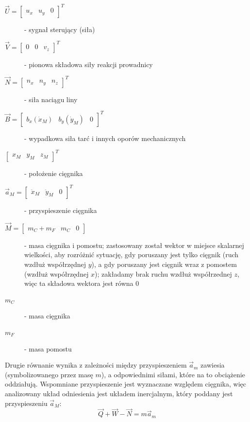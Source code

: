 \documentclass[10pt]{article}
\begin{document}
\begin{description}
\item[$\vec{U} = \begin{bmatrix} u_x & u_y & 0 \end{bmatrix}^T$] - sygnał sterujący (siła)
\item[$\vec{V} = \begin{bmatrix} 0 & 0 & v_z \end{bmatrix}^T$] - pionowa składowa siły reakcji prowadnicy
\item[$\vec{N} = \begin{bmatrix} n_x & n_y & n_z \end{bmatrix}^T$] - siła naciągu liny
\item[$\vec{B} = \begin{bmatrix} b_x (\dot{x}_M) & b_y (\dot{y}_M) & 0 \end{bmatrix}^T$] - wypadkowa siła tarć i innych oporów mechanicznych
\item[$\begin{bmatrix} x_M & y_M & z_M \end{bmatrix}^T$] - położenie cięgnika
\item[$\vec{a}_M = \begin{bmatrix} \ddot{x}_M & \ddot{y}_M & 0 \end{bmatrix}^T$] - przyspieszenie cięgnika
\item[$\vec{M} = \begin{bmatrix} m_C + m_F & m_C & 0 \end{bmatrix}$] - masa cięgnika i pomostu; zastosowany został wektor w miejsce skalarnej wielkości, aby rozróżnić sytuację, gdy poruszany jest tylko cięgnik (ruch wzdłuż współrzędnej $y$), a gdy poruszany jest cięgnik wraz z pomostem (wzdłuż współrzędnej $x$); zakładamy brak ruchu wzdłuż współrzednej $z$, więc ta składowa wektora jest równa $0$
\item[$m_C$] - masa cięgnika
\item[$m_F$] - masa pomostu
\end{description}

Drugie równanie wynika z zależności między przyspieszeniem $\vec{a}_m$ zawiesia (symbolizowanego przez masę $m$), a odpowiednimi siłami, które na to obciążenie oddziałują. Wspomniane przyspieszenie jest wyznaczane względem cięgnika, więc analizowany układ odniesienia jest układem inercjalnym, który poddany jest przyspieszeniu $\vec{a}_M$:
\begin{equation}
\vec{Q} + \vec{W} - \vec{N} = m\vec{a}_m
\end{equation}
\end{document}
